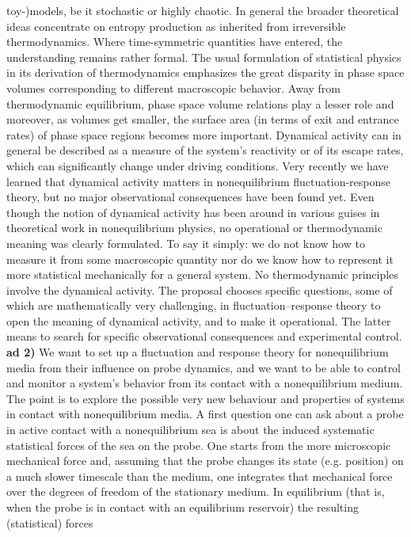 toy-)models, be it stochastic or highly chaotic. In general the broader theoretical ideas
concentrate on entropy production as inherited from irreversible thermodynamics. Where
time-symmetric quantities have entered, the understanding remains rather formal.  The usual
formulation of statistical physics in its derivation of thermodynamics emphasizes the great
disparity in phase space volumes corresponding to different macroscopic behavior. Away from
thermodynamic equilibrium, phase space volume relations play a lesser role and moreover, as
volumes get smaller, the surface area (in terms of exit and entrance rates) of phase space
regions becomes more important.  Dynamical activity can in general be described as a measure
of the system’s reactivity or of its escape rates, which can significantly change under
driving conditions. Very recently we have learned that dynamical activity matters in
nonequilibrium fluctuation-response theory, but no major observational consequences have
been found yet.
%
Even though the notion of dynamical activity has been around in various guises in theoretical work in nonequilibrium physics, no operational or thermodynamic meaning was clearly formulated. To say it simply: we do not know how to measure it from some macroscopic quantity nor do we know how to represent it more statistical mechanically for a general system. No thermodynamic principles involve the dynamical activity.  The proposal chooses specific questions, some of which are mathematically very challenging, in fluctuation–response theory to open the meaning of dynamical activity, and to make it operational. The latter means to search for specific observational consequences and experimental control.\\
%
{\bf ad 2)} We want to set up a fluctuation and response theory for nonequilibrium media
from their influence on probe dynamics, and we want to be able to control and monitor a
system’s behavior from its contact with a nonequilibrium medium. The point is to explore the
possible very new behaviour and properties of systems in contact with nonequilibrium
media. A first question one can ask about a probe in active contact with a nonequilibrium
sea is about the induced systematic statistical forces of the sea on the probe.  One starts
from the more microscopic mechanical force and, assuming that the probe changes its state
(e.g. position) on a much slower timescale than the medium, one integrates that mechanical
force over the degrees of freedom of the stationary medium.  In equilibrium (that is, when
the probe is in contact with an equilibrium reservoir) the resulting (statistical) forces
